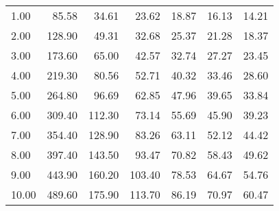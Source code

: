 \begin{tabular}{lrrrrrr}
1.00  &      85.58 &      34.61 &       23.62 &       18.87 &        16.13 &       14.21 \\
2.00  &     128.90 &      49.31 &       32.68 &       25.37 &        21.28 &       18.37 \\
3.00  &     173.60 &      65.00 &       42.57 &       32.74 &        27.27 &       23.45 \\
4.00  &     219.30 &      80.56 &       52.71 &       40.32 &        33.46 &       28.60 \\
5.00  &     264.80 &      96.69 &       62.85 &       47.96 &        39.65 &       33.84 \\
6.00  &     309.40 &     112.30 &       73.14 &       55.69 &        45.90 &       39.23 \\
7.00  &     354.40 &     128.90 &       83.26 &       63.11 &        52.12 &       44.42 \\
8.00  &     397.40 &     143.50 &       93.47 &       70.82 &        58.43 &       49.62 \\
9.00  &     443.90 &     160.20 &      103.40 &       78.53 &        64.67 &       54.76 \\
10.00 &     489.60 &     175.90 &      113.70 &       86.19 &        70.97 &       60.47 \\
\bottomrule
\end{tabular}
